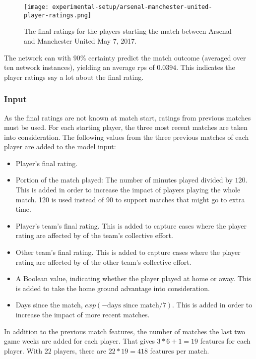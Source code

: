 \begin{figure}
    \centering
    \texttt{[image: experimental-setup/arsenal-manchester-united-player-ratings.png]}
    \caption{The final ratings for the players starting the match between Arsenal and Manchester United May 7, 2017.}
    \label{fig:arsenal-manchester-united-player-ratings}
\end{figure}

The network can with $90\%$ certainty predict the match outcome (averaged over ten network instances), yielding an average \gls{rps} of $0.0394$. This indicates the player ratings say a lot about the final rating.

\subsubsection{Input}

As the final ratings are not known at match start, ratings from previous matches must be used. For each starting player, the three most recent matches are taken into consideration. The following values from the three previous matches of each player are added to the model input:
\begin{itemize}[noitemsep]
    \item Player's final rating.
    \item Portion of the match played: The number of minutes played divided by $120$. This is added in order to increase the impact of players playing the whole match. 120 is used instead of 90 to support matches that might go to extra time.
    \item Player's team's final rating. This is added to capture cases where the player rating are affected by of the team's collective effort.
    \item Other team's final rating. This is added to capture cases where the player rating are affected by of the other team's collective effort.
    \item A Boolean value, indicating whether the player played at home or away. This is added to take the home ground advantage into consideration.
    \item Days since the match, $exp(-\text{days since match} / 7)$. This is added in order to increase the impact of more recent matches.
\end{itemize}

In addition to the previous match features, the number of matches the last two game weeks are added for each player. That gives $3 * 6 + 1 = 19$ features for each player. With $22$ players, there are $22 * 19 = 418$ features per match.